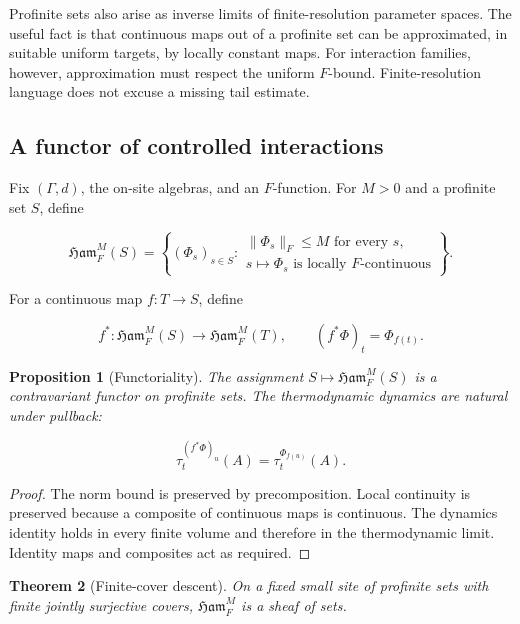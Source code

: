 \documentclass[12pt]{article}
\newtheorem{theorem}{Theorem}[section]
\newtheorem{proposition}[theorem]{Proposition}
\theoremstyle{definition}
\theoremstyle{remark}
\newcommand{\Ham}{\mathfrak{Ham}}
\begin{document}
Profinite sets also arise as inverse limits of finite-resolution parameter
spaces.  The useful fact is that continuous maps out of a profinite set can
be approximated, in suitable uniform targets, by locally constant maps.  For
interaction families, however, approximation must respect the uniform
$F$-bound.  Finite-resolution language does not excuse a missing tail
estimate.

\subsection{A functor of controlled interactions}

Fix $(\Gamma,d)$, the on-site algebras, and an $F$-function.  For $M>0$ and a
profinite set $S$, define

\begin{equation}
  \Ham_F^M(S)
  =\left\{
  (\Phi_s)_{s\in S}:
  \begin{array}{l}
  \|\Phi_s\|_F\le M\text{ for every }s,\\
  s\mapsto\Phi_s\text{ is locally }F\text{-continuous}
  \end{array}
  \right\}.
  \label{eq:Ham-functor}
\end{equation}

For a continuous map $f:T\to S$, define

\begin{equation}
  f^*:\Ham_F^M(S)\longrightarrow\Ham_F^M(T),
  \qquad
  (f^*\Phi)_t=\Phi_{f(t)}.
\end{equation}

\begin{proposition}[Functoriality]
The assignment $S\mapsto\Ham_F^M(S)$ is a contravariant functor on profinite
sets.  The thermodynamic dynamics are natural under pullback:

\begin{equation}
  \tau_t^{(f^*\Phi)_u}(A)=\tau_t^{\Phi_{f(u)}}(A).
\end{equation}
\end{proposition}

\begin{proof}
The norm bound is preserved by precomposition.  Local continuity is preserved
because a composite of continuous maps is continuous.  The dynamics identity
holds in every finite volume and therefore in the thermodynamic limit.
Identity maps and composites act as required.
\end{proof}

\begin{theorem}[Finite-cover descent]
\label{thm:descent}
On a fixed small site of profinite sets with finite jointly surjective covers,
$\Ham_F^M$ is a sheaf of sets.
\end{theorem}
\end{document}

